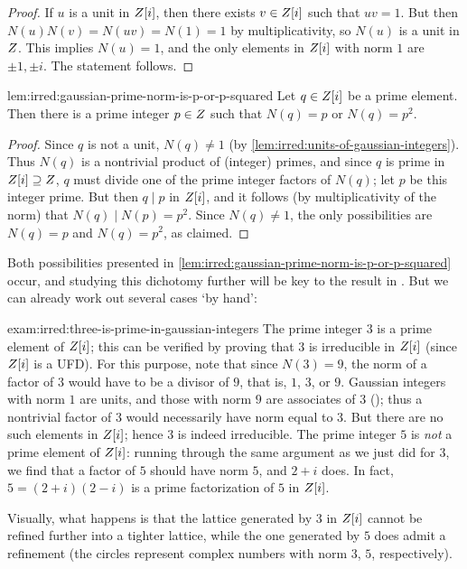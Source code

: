\begin{proof}
  If $u$ is a unit in $Z[i]$, then there exists $v \in Z[i]$ such
  that $uv = 1$. But then $N(u)N(v) = N(uv) = N(1) = 1$ by
  multiplicativity, so $N(u)$ is a unit in $Z$. This implies
  $N(u) = 1$, and the only elements in $Z[i]$ with norm $1$ are
  $\pm 1, \pm i$. The statement follows.
\end{proof}
\begin{lem}{}{lem:irred:gaussian-prime-norm-is-p-or-p-squared}
  Let $q \in Z[i]$ be a prime element. Then there is a prime integer
  $p \in Z$ such that $N(q) = p$ or $N(q) = p^2$.
\end{lem}

\begin{proof}
  Since $q$ is not a unit, $N(q) \neq 1$ (by
  \cref{lem:irred:units-of-gaussian-integers}). Thus $N(q)$ is a nontrivial product of
  (integer) primes, and since $q$ is prime in $Z[i] \supseteq Z$,
  $q$ must divide one of the prime integer factors of $N(q)$; let $p$
  be this integer prime. But then $q \mid p$ in $Z[i]$, and it
  follows (by multiplicativity of the norm) that
  $N(q) \mid N(p) = p^2$. Since $N(q) \neq 1$, the only possibilities
  are $N(q) = p$ and $N(q) = p^2$, as claimed.
\end{proof}
Both possibilities presented in \cref{lem:irred:gaussian-prime-norm-is-p-or-p-squared} occur, and
studying this dichotomy further will be key to the result in
. But we can
already work out several cases `by hand':
\begin{exam}{}{exam:irred:three-is-prime-in-gaussian-integers}
  The prime integer $3$ is a prime element of $Z[i]$; this can be
  verified by proving that $3$ is irreducible in $Z[i]$ (since
  $Z[i]$ is a UFD). For this purpose, note that since $N(3) = 9$, the
  norm of a factor of $3$ would have to be a divisor of $9$, that is,
  $1$, $3$, or $9$. Gaussian integers with norm $1$ are units, and
  those with norm $9$ are associates of $3$
  (); thus a
  nontrivial factor of $3$ would necessarily have norm equal to
  $3$. But there are no such elements in $Z[i]$; hence $3$ is indeed
  irreducible.  The prime integer $5$ is \emph{not} a prime element of
  $Z[i]$: running through the same argument as we just did for $3$,
  we find that a factor of $5$ should have norm $5$, and $2 + i$
  does. In fact, $5 = (2 + i)(2 - i)$ is a prime factorization of $5$
  in $Z[i]$.

  Visually, what happens is that the lattice generated by $3$ in
  $Z[i]$ cannot be refined further into a tighter lattice, while the
  one generated by $5$ does admit a refinement (the circles represent
  complex numbers with norm $3$, $5$, respectively).
\end{exam}

